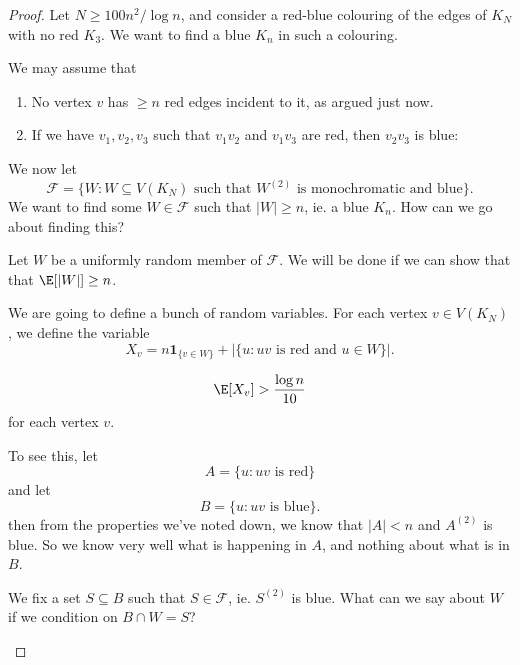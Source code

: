 \documentclass[a4paper]{article}
\begin{document}
\begin{proof}
  Let $N \geq 100n^2/\log n$, and consider a red-blue colouring of the edges of $K_N$ with no red $K_3$. We want to find a blue $K_n$ in such a colouring.

  We may assume that
  \begin{enumerate}
    \item No vertex $v$ has $ \geq n$ red edges incident to it, as argued just now.
    \item If we have $v_1, v_2, v_3$ such that $v_1v_2$ and $v_1 v_3$ are red, then $v_2 v_3$ is blue:
      \begin{center}
      \end{center}
  \end{enumerate}
  We now let
  \[
    \mathcal{F} = \{W : W \subseteq V(K_N)\text{ such that }W^{(2)} \text{ is monochromatic and blue}\}.
  \]
  We want to find some $W \in \mathcal{F}$ such that $|W| \geq n$, ie. a blue $K_n$. How can we go about finding this?

  Let $W$ be a uniformly random member of $\mathcal{F}$. We will be done if we can show that that $\E[|W|] \geq n$.

  We are going to define a bunch of random variables. For each vertex $v \in V(K_N)$, we define the variable
  \[
    X_v = n \mathbf{1}_{\{v \in W\}} + |\{u: uv\text{ is red and }u \in W\}|.
  \]
  \begin{claim}
   \[
    \E[X_v] > \frac{\log n}{10}
  \]
  for each vertex $v$.
  \end{claim}
  To see this, let
  \[
    A = \{u: uv \text{ is red}\}
  \]
  and let
  \[
    B = \{u: uv \text{ is blue}\}.
  \]
  then from the properties we've noted down, we know that $|A| < n$ and $A^{(2)}$ is blue. So we know very well what is happening in $A$, and nothing about what is in $B$.

  We fix a set $S \subseteq B$ such that $S \in \mathcal{F}$, ie. $S^{(2)}$ is blue. What can we say about $W$ if we condition on $B \cap W = S$?
  \begin{center}
\end{center}
\end{proof}
\end{document}
